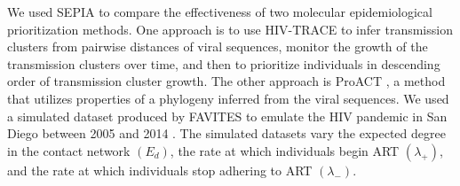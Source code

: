 \documentclass[twocolumn]{bmcart}%
\def\texttt{[image: ]}
\begin{document}
We used SEPIA to compare the effectiveness of two molecular epidemiological prioritization methods. One approach is to use HIV-TRACE to infer transmission clusters from pairwise distances of viral sequences, monitor the growth of the transmission clusters over time, and then to prioritize individuals in descending order of transmission cluster growth. The other approach is ProACT \cite{moshiri2019ProACT}, a method that utilizes properties of a phylogeny inferred from the viral sequences. We used a simulated dataset produced by FAVITES to emulate the HIV pandemic in San Diego between 2005 and 2014 \cite{moshiri2018favites}. The simulated datasets vary the expected degree in the contact network $\left(E_d\right)$, the rate at which individuals begin ART $\left(\lambda_+\right)$, and the rate at which individuals stop adhering to ART $\left(\lambda_-\right)$.





\end{document}
